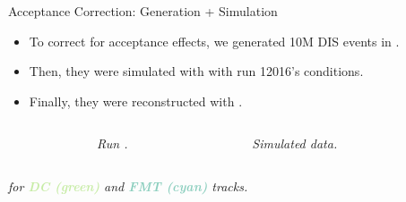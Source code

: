 \begin{frame}{Acceptance Correction: Generation + Simulation}
    \label{11.51::introduction}

    \begin{itemize}
        \item
            To correct for acceptance effects, we generated 10M DIS events in .

        \item
            Then, they were simulated with  with run 12016's conditions.

        \item
            Finally, they were reconstructed with .
    \end{itemize}

    \vspace{-12pt}

    \begin{columns}[onlytextwidth,T]

    \begin{column}{.05\linewidth}\end{column} %

    \begin{column}{.35\linewidth}
        \begin{center}
            \begin{figure}[t]
                \scriptsize{\textit{Run .}}
            \end{figure}
        \end{center}
    \end{column}

    \begin{column}{.35\linewidth}
        \begin{center}
            \begin{figure}[t]
                \scriptsize{\textit{Simulated data.}}
            \end{figure}
        \end{center}
    \end{column}

    \begin{column}{.05\linewidth}\end{column} %

    \end{columns}

    \begin{center}
        \scriptsize{\textit{
             for \textbf{\textcolor[HTML]{c7eca6}{DC (green)}} and \textbf{\textcolor[HTML]{8dcfbf}{FMT (cyan)}} tracks.
        }}
    \end{center}
\end{frame}

